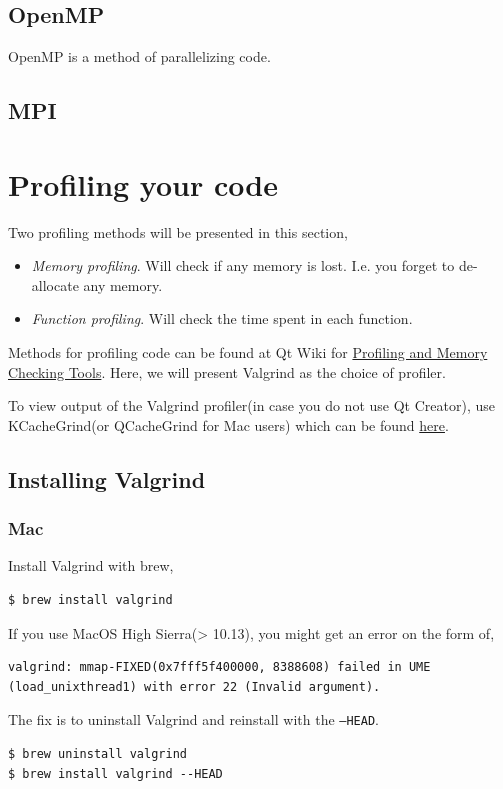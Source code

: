 \documentclass[11pt]{article}
\begin{document}
\subsection{OpenMP}
OpenMP is a method of parallelizing code.

\subsection{MPI}

\section{Profiling your code}
Two profiling methods will be presented in this section,
\begin{itemize}
    \item \textit{Memory profiling}. Will check if any memory is lost. I.e. you forget to de-allocate any memory.
    \item \textit{Function profiling}. Will check the time spent in each function.
\end{itemize}

Methods for profiling code can be found at Qt Wiki for \href{https://wiki.qt.io/Profiling_and_Memory_Checking_Tools}{Profiling and Memory Checking Tools}. Here, we will present Valgrind as the choice of profiler.

To view output of the Valgrind profiler(in case you do not use Qt Creator), use KCacheGrind(or QCacheGrind for Mac users) which can be found \href{https://github.com/KDE/kcachegrind}{here}.

\subsection{Installing Valgrind}
\subsubsection{Mac}
Install Valgrind with brew,
\begin{lstlisting}
$ brew install valgrind
\end{lstlisting}
If you use MacOS High Sierra(> 10.13), you might get an error on the form of,
\begin{lstlisting}
valgrind: mmap-FIXED(0x7fff5f400000, 8388608) failed in UME (load_unixthread1) with error 22 (Invalid argument).
\end{lstlisting}
The fix is to uninstall Valgrind and reinstall with the \texttt{--HEAD}.
\begin{lstlisting}
$ brew uninstall valgrind
$ brew install valgrind --HEAD
\end{lstlisting}
\end{document}
